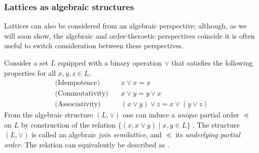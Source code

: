 \subsubsection{Lattices as algebraic structures}
\label{subsubsection:lattices-as-algebraic-structures}

Lattices can also be considered from an algebraic perspective; although, as we will soon show, the algebraic and order-theroetic perspectives coincide it is often useful to switch consideration between these perspectives.

Consider a set $L$ equipped with a binary operation $\vee$ that satisfies the following properties for all $x,y,z \in L$,
%
\begin{align}
  \text{(Idempotence)} & \quad x \vee x = x \label{eq:idempotence} \\
  \text{(Commutativity)} & \quad x \vee y = y \vee x \label{eq:commutativity} \\
  \text{(Associativity)} & \quad (x \vee y) \vee z = x \vee (y \vee z) \label{eq:associativity}
\end{align}
%
From the algebraic structure $(L, \vee)$ one can induce a \textit{unique} partial order $\preceq$ on $L$ by construction of the relation $\{(x, x \vee y) \mid x,y \in L \}$ \cite[pp. 173]{bergman2015invitation}. The structure $(L, \vee)$ is called an algebraic \textit{join semilattice}, and $\preceq$ its \textit{underlying partial order}. The relation can equivalently be described as  \cite[pp.173]{bergman2015invitation}.
%

